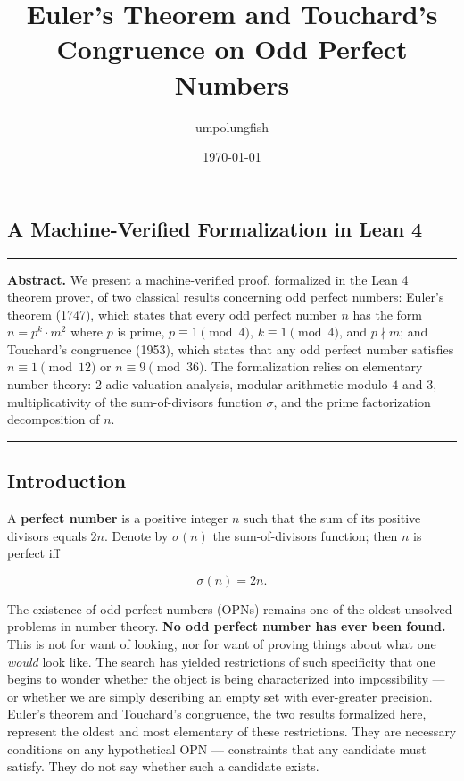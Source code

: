 \documentclass[11pt,a4paper]{article}
\begin{document}
\title{Euler's Theorem and Touchard's Congruence on Odd Perfect Numbers}
\author{umpolungfish}
\date{\today}

\maketitle

\subsection{A Machine-Verified Formalization in Lean 4}

\begin{center}
\rule{0.5\textwidth}{0.4pt}
\end{center}

\textbf{Abstract.} We present a machine-verified proof, formalized in the Lean 4 theorem prover, of two classical results concerning odd perfect numbers: Euler's theorem (1747), which states that every odd perfect number $n$ has the form $n = p^k \cdot m^2$ where $p$ is prime, $p \equiv 1 \pmod{4}$, $k \equiv 1 \pmod{4}$, and $p \nmid m$; and Touchard's congruence (1953), which states that any odd perfect number satisfies $n \equiv 1 \pmod{12}$ or $n \equiv 9 \pmod{36}$. The formalization relies on elementary number theory: $2$-adic valuation analysis, modular arithmetic modulo $4$ and $3$, multiplicativity of the sum-of-divisors function $\sigma$, and the prime factorization decomposition of $n$.

\begin{center}
\rule{0.5\textwidth}{0.4pt}
\end{center}

\subsection{Introduction}

A \textbf{perfect number} is a positive integer $n$ such that the sum of its positive divisors equals $2n$. Denote by $\sigma(n)$ the sum-of-divisors function; then $n$ is perfect iff

\[\sigma(n) = 2n.\]

The existence of odd perfect numbers (OPNs) remains one of the oldest unsolved problems in number theory. \textbf{No odd perfect number has ever been found.} This is not for want of looking, nor for want of proving things about what one \emph{would} look like. The search has yielded restrictions of such specificity that one begins to wonder whether the object is being characterized into impossibility --- or whether we are simply describing an empty set with ever-greater precision. Euler's theorem and Touchard's congruence, the two results formalized here, represent the oldest and most elementary of these restrictions. They are necessary conditions on any hypothetical OPN --- constraints that any candidate must satisfy. They do not say whether such a candidate exists.
\end{document}
